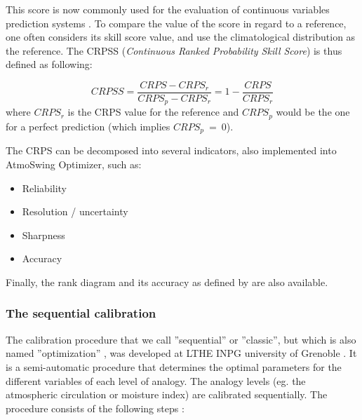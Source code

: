 \documentclass[review]{elsarticle}
\begin{document}
This score is now commonly used for the evaluation of continuous variables prediction systems \citep{Casati2008, Marty2010}. To compare the value of the score in regard to a reference, one often considers its skill score value, and use the climatological distribution as the reference. The CRPSS (\textit{Continuous Ranked Probability Skill Score}) is thus defined as following:

\begin{equation}
\label{eq:CRPSS}
CRPSS = \frac{CRPS-CRPS_{r}}{CRPS_{p}-CRPS_{r}} = 1-\frac{CRPS}{CRPS_{r}}
\end{equation}
where $CRPS_{r}$ is the CRPS value for the reference and $CRPS_{p}$ would be the one for a perfect prediction (which implies $CRPS_{p}~=~0$).

The CRPS can be decomposed into several indicators, also implemented into AtmoSwing Optimizer, such as:

\begin{itemize}
	\setlength\itemsep{-1mm}
	\item Reliability \citep{Hersbach2000}
	\item Resolution / uncertainty \citep{Hersbach2000}
	\item Sharpness \citep{Bontron2004}
	\item Accuracy \citep{Bontron2004}
\end{itemize}

Finally, the rank diagram \citep{Talagrand1997} and its accuracy as defined by \citet{Candille2005} are also available.


\subsubsection{The sequential calibration}
\label{sec:atmoswing-calibration}

The calibration procedure that we call ''sequential'' or ''classic'', but which is also named ''optimization'' \cite[eg. by ][]{BenDaoud2015}, was developed at LTHE \textendash INPG university of Grenoble \citep{Bontron2004}. It is a semi-automatic procedure that determines the optimal parameters for the different variables of each level of analogy. The analogy levels (eg. the atmospheric circulation or moisture index) are calibrated sequentially. The procedure consists of the following steps \citep{Bontron2004}:
\end{document}
